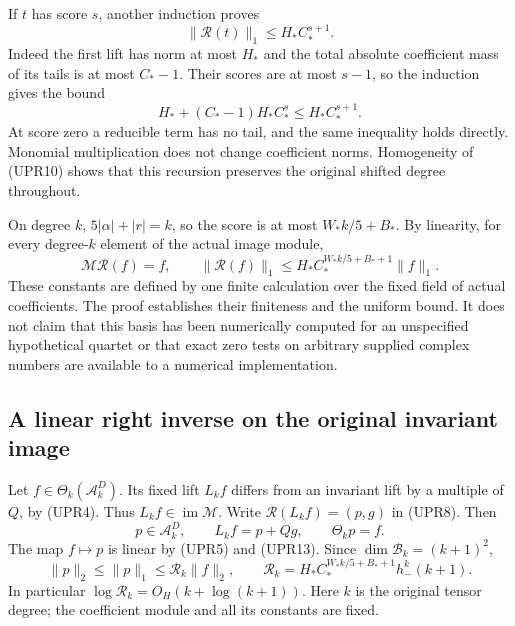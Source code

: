 If \(t\) has score \(s\), another induction proves
\[
\|\mathcal R(t)\|_1\le H_*C_*^{s+1}.
\tag{UPR15}
\]
Indeed the first lift has norm at most \(H_*\) and the total
absolute coefficient mass of its tails is at most \(C_*-1\).
Their scores are at most \(s-1\), so the induction gives the bound
\[
H_*+(C_*-1)H_*C_*^s\le H_*C_*^{s+1}.
\]
At score zero a reducible term has no tail, and the same inequality
holds directly.  Monomial multiplication does not change coefficient
norms.  Homogeneity of (UPR10) shows that this recursion preserves
the original shifted degree throughout.

On degree \(k\), \(5|\alpha|+|r|=k\), so the score is at most
\(W_*k/5+B_*\).  By linearity, for every degree-\(k\) element of
the actual image module,
\[
\mathcal M\mathcal R(f)=f,\qquad
\|\mathcal R(f)\|_1
\le H_*C_*^{W_*k/5+B_*+1}\|f\|_1.
\tag{UPR16}
\]
These constants are defined by one finite calculation over the
fixed field of actual coefficients.  The proof establishes their
finiteness and the uniform bound.  It does not claim that this
basis has been numerically computed for an unspecified hypothetical
quartet or that exact zero tests on arbitrary supplied complex
numbers are available to a numerical implementation.

\subsection{A linear right inverse on the original invariant image}
Let \(f\in\Theta_k(\mathcal A_k^D)\).  Its fixed lift \(L_kf\)
differs from an invariant lift by a multiple of \(Q\), by (UPR4).
Thus \(L_kf\in\operatorname{im}\mathcal M\).
Write \(\mathcal R(L_kf)=(p,g)\) in (UPR8).  Then
\[
p\in\mathcal A_k^D,\qquad L_kf=p+Qg,\qquad \Theta_kp=f.
\]
The map \(f\mapsto p\) is linear by (UPR5) and (UPR13).
Since \(\dim\mathcal B_k=(k+1)^2\),
\[
\|p\|_2\le\|p\|_1
\le\mathscr R_k\|f\|_2,\qquad
\mathscr R_k=
H_*C_*^{W_*k/5+B_*+1}h_-^k(k+1).
\tag{UPR17}
\]
In particular \(\log\mathscr R_k=O_{H}(k+\log(k+1))\).
Here \(k\) is the original tensor degree; the coefficient module
and all its constants are fixed.

